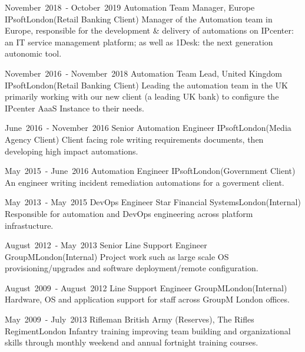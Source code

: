 
\cventry %
  {\mbox{November 2018 -} \mbox{October 2019}}
  {Automation Team Manager, Europe}
  {IPsoft}{London}{(Retail Banking Client)}
  { 
    Manager of the Automation team in Europe, responsible for the 
    development \& delivery of automations on IPcenter: an IT service management 
    platform; as well as 1Desk: the next generation autonomic tool.
  }

\cventry %
  {\mbox{November 2016 -} \mbox{November 2018}}
  {Automation Team Lead, United Kingdom}
  {IPsoft}{London}{(Retail Banking Client)}
  {
    Leading the automation team in the UK primarily working with our new client (a leading UK bank) to 
    configure the IPcenter AaaS Instance to their needs. 
  }

\cventry %
  {\mbox{June 2016 -} \mbox{November 2016}}
  {Senior Automation Engineer}
  {IPsoft}{London}{(Media Agency Client)}
  {
    Client facing role writing requirements documents, then developing high impact automations.
  }

\cventry %
  {\mbox{May 2015 -} \mbox{June 2016}}
  {Automation Engineer}
  {IPsoft}{London}{(Government Client)}
  {
    An engineer writing incident remediation automations for a goverment client.
  }

\cventry %
  {\mbox{May 2013 -} \mbox{May 2015}}
  {DevOps Engineer}
  {Star Financial Systems}{London}{(Internal)}
  {
    Responsible for automation and DevOps engineering across platform infrastucture. 
  }



\cventry %
  {\mbox{August 2012 -} \mbox{May 2013}}
  {Senior  Line Support Engineer}
  {GroupM}{London}{(Internal)}
  {
    Project work such as large scale OS provisioning/upgrades and software 
    deployment/remote configuration.\\
  }

\cventry %
  {\mbox{August 2009 -} \mbox{August 2012}}
  { Line Support Engineer}
  {GroupM}{London}{(Internal)}
  {
    Hardware, OS and application support for staff across GroupM London offices.\\
  }

\cventry %
  {\mbox{May 2009 -} \mbox{July 2013}}
  {Rifleman}
  {British Army (Reserves), The Rifles Regiment}{London}{}
  {
    Infantry training improving team building and organizational skills through 
    monthly weekend and annual fortnight training courses.\\
  }

